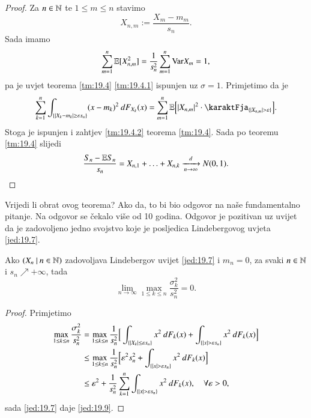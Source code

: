 \begin{proof}
    Za $n \in \mathbb{N}$ te $1 \leq m \leq n$ stavimo
    \begin{equation*}
        X_{n, m} := \frac{X_m - m_m}{s_n}.
    \end{equation*}
    Sada imamo
    \begin{equation*}
        \sum\limits_{m = 1}^{n} \mathbb{E} [X_{n, m}^2] = \frac{1}{s_n^2} \sum\limits_{m = 1}^{n} \mathrm{Var} X_m = 1,
    \end{equation*}
    pa je uvjet teorema \ref{tm:19.4} \ref{tm:19.4.1} ispunjen uz $\sigma = 1$.
    Primjetimo da je
    \begin{equation*}
        \suma{k = 1}{n} \int_{\{|X_k - m_k| \geq \varepsilon s_n\}} (x - m_k)^2 \: d F_{X_k} (x) = \suma{m = 1}{n} \masE \Big[ |X_{n, m}|^2 \cdot \karaktFja_{\{ |X_{n, m}| > \varepsilon \}} \Big].
    \end{equation*}
    Stoga je ispunjen i zahtjev \ref{tm:19.4.2} teorema \ref{tm:19.4}.
    Sada po teoremu \ref{tm:19.4} slijedi
    \begin{equation*}
        \frac{S_n - \mathbb{E} S_n}{s_n} = X_{n, 1} + \ldots + X_{n, k} \xrightarrow[n \to \infty]{d} N(0, 1).
    \end{equation*}
\end{proof}

Vrijedi li obrat ovog teorema?
Ako da, to bi bio odgovor na na\v se fundamentalno pitanje.
Na odgovor se \v cekalo vi\v se od 10 godina.
Odgovor je pozitivan uz uvijet da je zadovoljeno jedno svojstvo koje je posljedica Lindebergovog uvjeta \eqref{jed:19.7}.

\begin{lm}  \label{lm:19.8}
    Ako $({X_n} \: | \: {n \in \mathbb{N}})$ zadovoljava Lindebergov uvijet \eqref{jed:19.7} i $m_n = 0$, za svaki $n \in \mathbb{N}$ i $s_n \nearrow +\infty$, tada
    \begin{equation}    \label{jed:19.9}
        \lim\limits_{n \to \infty} \max\limits_{1 \leq k \leq n} \frac{\sigma_k^2}{s_n^2} = 0.
    \end{equation}
\end{lm}

\begin{proof}
    Primjetimo
    \begin{equation*}
        \begin{aligned}
            \max\limits_{1 \leq k \leq n} \frac{\sigma_k^2}{s_n^2} &= \max\limits_{1 \leq k \leq n} \frac{1}{s_n^2} \Big[ \int_{\{ |X_k|\leq \varepsilon s_n \}} x^2 \: d F_k (x) + \int_{\{ |x| > \varepsilon s_n \}} x^2 \: d F_k (x) \Big]\\
            &\leq \max\limits_{1 \leq k \leq n} \frac{1}{s_n^2} \Big[ \varepsilon^2 s_n^2 + \int_{\{ |x| > \varepsilon s_n \}} x^2 \: d F_k (x) \Big]\\
            &\leq \varepsilon^2 + \frac{1}{s_n^2} \sum\limits_{k = 1}^{n} \int_{\{ |x| > \varepsilon s_n \}} x^2 \: d F_k (x), \quad \forall \varepsilon > 0,
        \end{aligned}
    \end{equation*}
    sada \eqref{jed:19.7} daje \eqref{jed:19.9}.
\end{proof}

